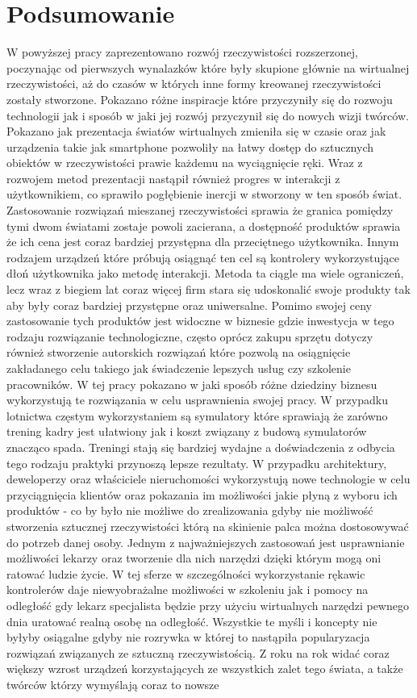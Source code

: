 \chapter*{Podsumowanie}
\label{ch:podsumowanie}

W powyższej pracy zaprezentowano rozwój rzeczywistości rozszerzonej, poczynając od pierwszych wynalazków które były skupione głównie na wirtualnej rzeczywistości, aż do czasów w których inne formy kreowanej rzeczywistości zostały stworzone. Pokazano różne inspiracje które przyczyniły się do rozwoju technologii jak i sposób w jaki jej rozwój przyczynił się do nowych wizji twórców. Pokazano jak prezentacja światów wirtualnych zmieniła się w czasie oraz jak urządzenia takie jak smartphone pozwoliły na łatwy dostęp do sztucznych obiektów w rzeczywistości prawie każdemu na wyciągnięcie ręki. Wraz z rozwojem metod prezentacji nastąpił również progres w interakcji z użytkownikiem, co sprawiło pogłębienie inercji w stworzony w ten sposób świat. Zastosowanie rozwiązań mieszanej rzeczywistości sprawia że granica pomiędzy tymi dwom światami zostaje powoli zacierana, a dostępność produktów sprawia że ich cena jest coraz bardziej przystępna dla przeciętnego użytkownika. Innym rodzajem urządzeń które próbują osiągnąć ten cel są kontrolery wykorzystujące dłoń użytkownika jako metodę interakcji. Metoda ta ciągle ma wiele ograniczeń, lecz wraz z biegiem lat coraz więcej firm stara się udoskonalić swoje produkty tak aby były coraz bardziej przystępne oraz uniwersalne. Pomimo swojej ceny zastosowanie tych produktów jest widoczne w biznesie gdzie inwestycja w tego rodzaju rozwiązanie technologiczne, często oprócz zakupu sprzętu dotyczy również stworzenie autorskich rozwiązań które pozwolą na osiągnięcie zakładanego celu takiego jak świadczenie lepszych usług czy szkolenie pracowników. W tej pracy pokazano w jaki sposób różne dziedziny biznesu wykorzystują te rozwiązania w celu usprawnienia swojej pracy. W przypadku lotnictwa częstym wykorzystaniem są symulatory które sprawiają że zarówno trening kadry jest ułatwiony jak i koszt związany z budową symulatorów znacząco spada. Treningi stają się bardziej wydajne a doświadczenia z odbycia tego rodzaju praktyki przynoszą lepsze rezultaty. W przypadku architektury, deweloperzy oraz właściciele nieruchomości wykorzystują nowe technologie w celu przyciągnięcia klientów oraz pokazania im możliwości jakie płyną z wyboru ich produktów - co by było nie możliwe do zrealizowania gdyby nie możliwość stworzenia sztucznej rzeczywistości którą na skinienie palca można dostosowywać do potrzeb danej osoby. Jednym z najważniejszych zastosowań jest usprawnianie możliwości lekarzy oraz tworzenie dla nich narzędzi dzięki którym mogą oni ratować ludzie życie. W tej sferze w szczególności wykorzystanie rękawic kontrolerów daje niewyobrażalne możliwości w szkoleniu jak i pomocy na odległość gdy lekarz specjalista będzie przy użyciu wirtualnych narzędzi pewnego dnia uratować realną osobę na odległość. Wszystkie te myśli i koncepty nie byłyby osiągalne gdyby nie rozrywka w której to nastąpiła popularyzacja rozwiązań związanych ze sztuczną rzeczywistością. Z roku na rok widać coraz większy wzrost urządzeń korzystających ze wszystkich zalet tego świata, a także twórców którzy wymyślają coraz to nowsze 